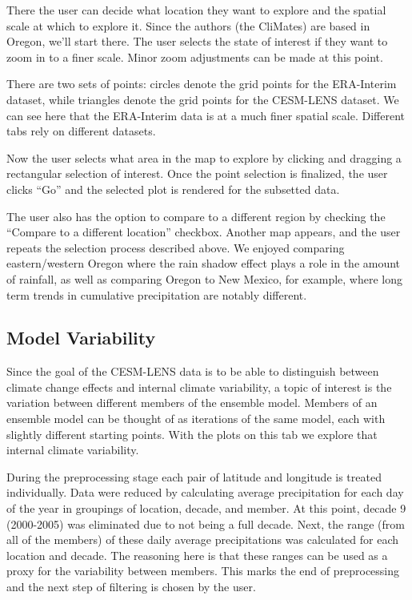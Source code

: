 \documentclass[10pt,letterpaper]{article}
\begin{document}
There the user can decide what location they want to explore and the spatial scale at which to explore it. Since the authors (the CliMates) are based in Oregon, we’ll start there. The user selects the state of interest if they want to zoom in to a finer scale. Minor zoom adjustments can be made at this point.

 There are two sets of points: circles denote the grid points for the ERA-Interim dataset, while triangles denote the grid points for the CESM-LENS dataset. We can see here that the ERA-Interim data is at a much finer spatial scale. Different tabs rely on different datasets.


Now the user selects what area in the map to explore by clicking and dragging a rectangular selection of interest. Once the point selection is finalized, the user clicks “Go” and the selected plot is rendered for the subsetted data.



The user also has the option to compare to a different region by checking the “Compare to a different location” checkbox. Another map appears, and the user repeats the selection process described above. We enjoyed comparing eastern/western Oregon where the rain shadow effect plays a role in the amount of rainfall, as well as comparing Oregon to New Mexico, for example, where long term trends in cumulative precipitation are notably different.



\subsection*{Model Variability}

Since the goal of the CESM-LENS data is to be able to distinguish between climate change effects and internal climate variability, a topic of interest is the variation between different members of the ensemble model. Members of an ensemble model can be thought of as iterations of the same model, each with slightly different starting points. With the plots on this tab we explore that internal climate variability.

During the preprocessing stage each pair of latitude and longitude is treated individually. Data were reduced by calculating average precipitation for each day of the year in groupings of location, decade, and member. At this point, decade 9 (2000-2005) was eliminated due to not being a full decade. Next, the range (from all of the members) of these daily average precipitations was calculated for each location and  decade. The reasoning here is that these ranges can be used as a proxy for the variability between members. This marks the end of preprocessing and the next step of filtering is chosen by the user.
\end{document}
